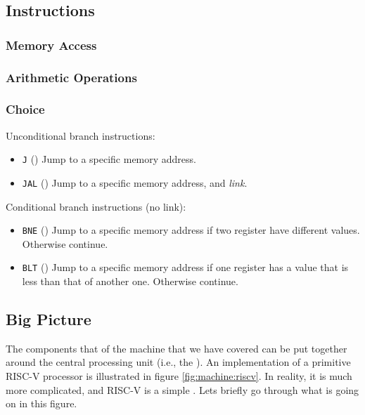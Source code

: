 \subsection{Instructions}

\subsubsection{Memory Access}

\subsubsection{Arithmetic Operations}


\subsubsection{Choice}


Unconditional branch instructions:
\begin{itemize}
  \item \texttt{J} () Jump to a specific memory address.
  \item \texttt{JAL} () Jump to a specific memory address, and \textsl{link}.
\end{itemize}

Conditional branch instructions (no link):
\begin{itemize}
  \item \texttt{BNE} () Jump to a specific memory address if two register have different values. Otherwise continue.
  \item \texttt{BLT} () Jump to a specific memory address if one register has a value that is less than that of another one. Otherwise continue.
\end{itemize}

\subsection{Big Picture}

The components that of the machine that we have covered can be put together around the central processing unit (i.e., the ). An implementation of a primitive RISC-V processor is illustrated in figure \ref{fig:machine:riscv}. In reality, it is much more complicated, and RISC-V is a simple . Lets briefly go through what is going on in this figure.

